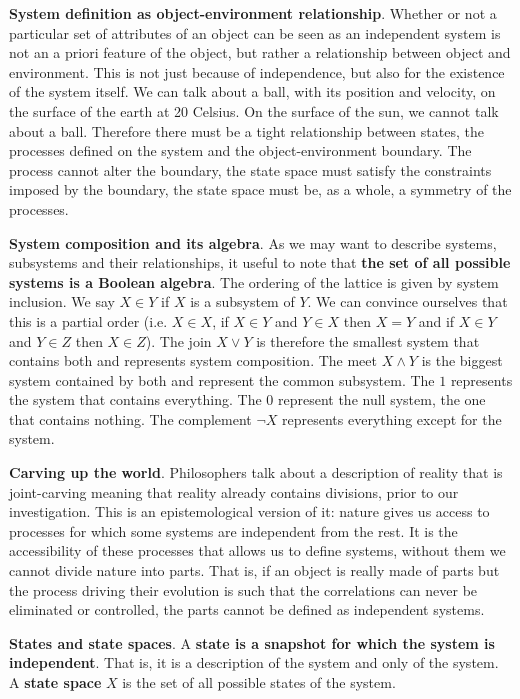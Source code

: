 \documentclass[10pt, onecolumn, longbibliography, nofootinbib]{revtex4-2}
\begin{document}
\textbf{System definition as object-environment relationship}. Whether or not a particular set of attributes of an object can be seen as an independent system is not an a priori feature of the object, but rather a relationship between object and environment. This is not just because of independence, but also for the existence of the system itself. We can talk about a ball, with its position and velocity, on the surface of the earth at 20 Celsius. On the surface of the sun, we cannot talk about a ball. Therefore there must be a tight relationship between states, the processes defined on the system and the object-environment boundary. The process cannot alter the boundary, the state space must satisfy the constraints imposed by the boundary, the state space must be, as a whole, a symmetry of the processes.

\textbf{System composition and its algebra}. As we may want to describe systems, subsystems and their relationships, it useful to note that \textbf{the set of all possible systems is a Boolean algebra}. The ordering of the lattice is given by system inclusion. We say $X \in Y$ if $X$ is a subsystem of $Y$. We can convince ourselves that this is a partial order (i.e. $X \in X$, if $X \in Y$ and $Y \in X$ then $X=Y$ and if $X \in Y$ and $Y \in Z$ then $X \in Z$). The join $X \vee Y$ is therefore the smallest system that contains both and represents system composition. The meet $X \wedge Y$ is the biggest system contained by both and represent the common subsystem. The $1$ represents the system that contains everything. The $0$ represent the null system, the one that contains nothing. The complement $\neg X$ represents everything except for the system.

\textbf{Carving up the world}. Philosophers talk about a description of reality that is joint-carving meaning that reality already contains divisions, prior to our investigation. This is an epistemological version of it: nature gives us access to processes for which some systems are independent from the rest. It is the accessibility of these processes that allows us to define systems, without them we cannot divide nature into parts. That is, if an object is really made of parts but the process driving their evolution is such that the correlations can never be eliminated or controlled, the parts cannot be defined as independent systems.

\textbf{States and state spaces}. A \textbf{state is a snapshot for which the system is independent}. That is, it is a description of the system and only of the system. A \textbf{state space} $X$ is the set of all possible states of the system.
\end{document}
